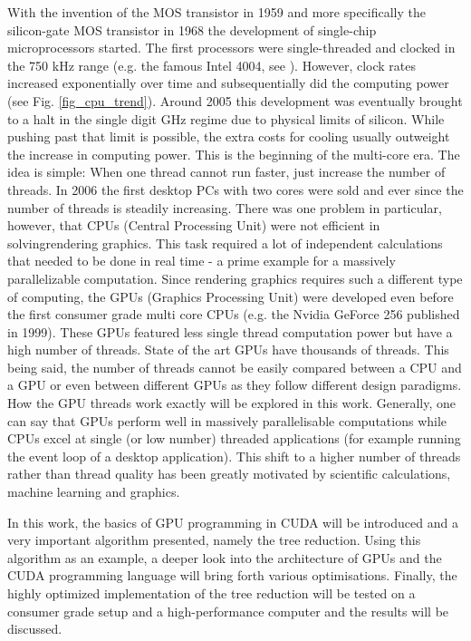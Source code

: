 With the invention of the MOS transistor in 1959 and more specifically the silicon-gate MOS transistor in 1968 the development of single-chip microprocessors started.
The first processors were single-threaded and clocked in the 750 kHz range (e.g. the famous Intel 4004, see \cite{Intel4004}).
However, clock rates increased exponentially over time and subsequentially did the computing power (see Fig. \ref{fig_cpu_trend}).
Around 2005 this development was eventually brought to a halt in the single digit GHz regime due to physical limits of silicon. 
While pushing past that limit is possible, the extra costs for cooling usually outweight the increase in computing power.
This is the beginning of the multi-core era. 
The idea is simple: When one thread cannot run faster, just increase the number of threads.
In 2006 the first desktop PCs with two cores were sold and ever since the number of threads is steadily increasing.
There was one problem in particular, however, that CPUs (Central Processing Unit) were not efficient in solvingrendering graphics.
This task required a lot of independent calculations that needed to be done in real time - a prime example for a massively parallelizable computation.
Since rendering graphics requires such a different type of computing, the GPUs (Graphics Processing Unit) were developed even before the first consumer grade multi core CPUs (e.g. the Nvidia GeForce 256 published in 1999).
These GPUs featured less single thread computation power but have a high number of threads.
State of the art GPUs have thousands of threads.
This being said, the number of threads cannot be easily compared between a CPU and a GPU or even between different GPUs as they follow different design paradigms.
How the GPU threads work exactly will be explored in this work.
Generally, one can say that GPUs perform well in massively parallelisable computations while CPUs excel at single (or low number) threaded applications (for example running the event loop of a desktop application).
This shift to a higher number of threads rather than thread quality has been greatly motivated by scientific calculations, machine learning and graphics.

In this work, the basics of GPU programming in CUDA will be introduced and a very important algorithm presented, namely the tree reduction.
Using this algorithm as an example, a deeper look into the architecture of GPUs and the CUDA programming language will bring forth various optimisations.
Finally, the highly optimized implementation of the tree reduction will be tested on a consumer grade setup and a high-performance computer and the results will be discussed.

